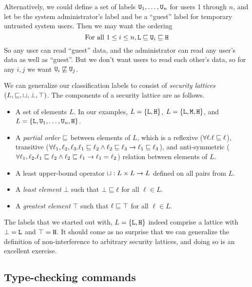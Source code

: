 \documentclass[11pt,twoside]{scrartcl}
\begin{document}
Alternatively, we could define a set of labels $\texttt{\upshape U}_1, \ldots, \texttt{\upshape U}_n$ for users 1 through $n$, and let \hisec be the system administrator's label and \lowsec be a ``guest'' label for temporary untrusted system users. Then we may want the ordering
\begin{equation}
\label{eq:ord3}
\text{For all}~1 \le i \le n, \lowsec \posetleq \usec_i \posetleq \hisec
\end{equation}
So any user can read ``guest'' data, and the administrator can read any user's data as well as ``guest''. But we don't want users to read each other's data, so for any $i,j$ we want $\texttt{\upshape U}_i \not\sqsubseteq \texttt{\upshape U}_j$.

We can generalize our classification labels to consist of \emph{security lattices} $(L, \sqsubseteq, \sqcup, \bot, \top)$. The components of a security lattice are as follows.
\begin{itemize}
\item A set of elements $L$. In our examples, $L = \{\texttt{\upshape L},\texttt{\upshape H}\}$, $L = \{\texttt{\upshape L},\texttt{\upshape M},\texttt{\upshape H}\}$, and $L = \{\texttt{\upshape L},\texttt{\upshape U}_1,\ldots,\texttt{\upshape U}_n,\texttt{\upshape H}\}$.
\item A \emph{partial order} $\sqsubseteq$ between elements of $L$, which is a reflexive ($\forall \ell . \ell \sqsubseteq \ell$), transitive ($\forall \ell_1,\ell_2,\ell_3 . \ell_1 \sqsubseteq \ell_2 \land \ell_2 \sqsubseteq \ell_3 \rightarrow \ell_1 \sqsubseteq \ell_3$), and anti-symmetric ($\forall \ell_1,\ell_2 . \ell_1 \sqsubseteq \ell_2 \land \ell_2 \sqsubseteq \ell_1 \rightarrow \ell_1 = \ell_2$) relation between elements of $L$.
\item A least upper-bound operator $\sqcup : L \times L \to L$ defined on all pairs from $L$.
\item A \emph{least element} $\bot$ such that $\bot \sqsubseteq \ell$ for all $\ell \in L$.
\item A \emph{greatest element} $\top$ such that $\ell \sqsubseteq \top$ for all $\ell \in L$.
\end{itemize}
The labels that we started out with, $L = \{\texttt{\upshape L},\texttt{\upshape H}\}$ indeed comprise a lattice with $\bot = \texttt{\upshape L}$ and $\top = \texttt{\upshape H}$. It should come as no surprise that we can generalize the definition of non-interference to arbitrary security lattices, and doing so is an excellent exercise.

\subsection{Type-checking commands}
\end{document}
